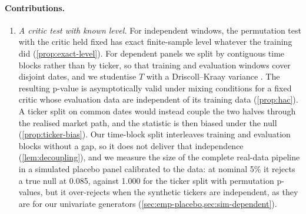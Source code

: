 \paragraph{Contributions.}
\begin{enumerate}
  \item \emph{A critic test with known level.} For independent windows, the permutation test with
  the critic held fixed has exact finite-sample level whatever the training did
  (\cref{prop:exact-level}). For dependent panels we split by contiguous time blocks rather than
  by ticker, so that training and evaluation windows cover disjoint dates, and we studentise $T$
  with a Driscoll--Kraay variance \citep{driscoll1998consistent}. The resulting p-value is
  asymptotically valid under mixing conditions for a fixed critic whose evaluation data are
  independent of its training data (\cref{prop:hac}). A ticker split on common dates would
  instead couple the two halves through the realised market path, and the statistic is then
  biased under the null (\cref{prop:ticker-bias}). Our time-block split interleaves training and
  evaluation blocks without a gap, so it does not deliver that independence
  (\cref{lem:decoupling}), and we measure the size of the complete real-data pipeline in a
  simulated placebo panel calibrated to the data: at nominal 5\% it rejects a true null at 0.085,
  against 1.000 for the ticker split with permutation p-values, but it over-rejects when the
  synthetic tickers are independent, as they are for our univariate generators
  (\cref{sec:emp-placebo,sec:sim-dependent}).


\end{enumerate}
